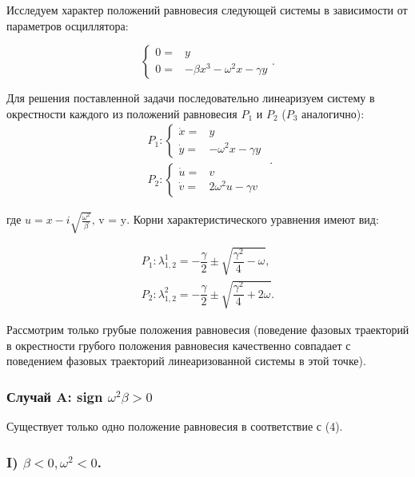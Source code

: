 \documentclass[11pt]{article}
\begin{document}
Исследуем характер положений равновесия следующей системы в зависимости
от параметров осциллятора:

\[
\left\{
\begin{array}{cc}
 0 = & y \\
 0 = & -\beta x^3 - \omega^2 x -\gamma y 
\end{array} \right. .
\]

Для решения поставленной задачи последовательно линеаризуем систему в
окрестности каждого из положений равновесия \(P_1\) и \(P_2\) (\(P_3\)
аналогично): \[
\begin{array}{cc}
P_1: \left\{
\begin{array}{cc}
 \dot{x} = & y \\
 \dot{y} = &  -\omega^2 x -\gamma y 
\end{array} \right. \\
P_2: \left\{
\begin{array}{cc}
 \dot{u} = & v \\
 \dot{v} = &  2 \omega^2 u -\gamma v 
\end{array} \right.
\end{array} .
\]

где \(u = x - i \sqrt{\frac{\omega^2 }{\beta}} \text{, v = y.}\) Корни
характеристического уравнения имеют вид:

\[\begin{array}{cc}
P_1: \lambda _{1,2}^1=-\dfrac{\gamma }{2}\pm \sqrt{\dfrac{\gamma ^2}{4}-\omega }, \\
P_2: \lambda _{1,2}^2=-\dfrac{\gamma }{2}\pm \sqrt{\dfrac{\gamma ^2}{4}+2 \omega} .
\end{array}
\]

Рассмотрим только грубые положения равновесия (поведение фазовых
траекторий в окрестности грубого положения равновесия качественно
совпадает с поведением фазовых траекторий линеаризованной системы в этой
точке).

\hypertarget{ux441ux43bux443ux447ux430ux439-a-sign-omega2-beta-0}{%
\subsubsection{\texorpdfstring{Случай A: sign
\(\omega^2 \beta >0\)}{Случай A: sign \textbackslash omega\^{}2 \textbackslash beta \textgreater0}}\label{ux441ux43bux443ux447ux430ux439-a-sign-omega2-beta-0}}

Существует только одно положение равновесия в соответствие с (4).

\hypertarget{i-beta-0-omega2-0.}{%
\subsubsection{\texorpdfstring{I)
\(\beta <0, \omega^2 <0\).}{I) \textbackslash beta \textless0, \textbackslash omega\^{}2 \textless0.}}\label{i-beta-0-omega2-0.}}
\end{document}
